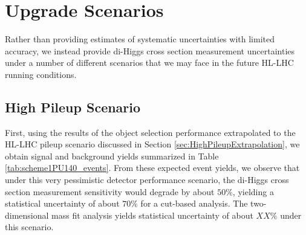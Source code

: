 \documentclass{cmspaper}
\begin{document}
\section{Upgrade Scenarios}
\label{sec:scnearios}

Rather than providing estimates of systematic uncertainties with limited accuracy, we instead
provide di-Higgs cross section measurement uncertainties under a number of different scenarios
that we may face in the future HL-LHC running conditions. 

\subsection{High Pileup Scenario}
First, using the results of the object selection performance extrapolated to the HL-LHC pileup scenario
discussed in Section \ref{sec:HighPileupExtrapolation}, we obtain signal and background yields
summarized in Table \ref{tab:scheme1PU140_events}. From these expected event yields, we observe
that under this very pessimistic detector performance scenario, the di-Higgs cross section
measurement sensitivity would degrade by about $50\%$, yielding a statistical 
uncertainty of about $70\%$ for a cut-based analysis. The two-dimensional mass fit analysis
yields statistical uncertainty of about $XX\%$ under this scenario. 
\end{document}
